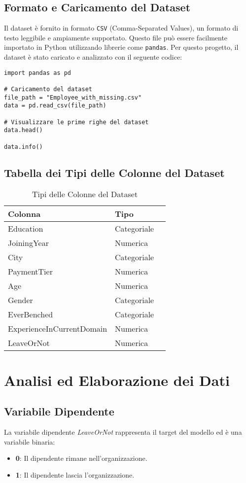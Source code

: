 \documentclass[a4paper,12pt]{article}
\begin{document}
\subsection{Formato e Caricamento del Dataset}
Il dataset è fornito in formato \texttt{CSV} (Comma-Separated Values), un formato di testo leggibile e ampiamente supportato. Questo file può essere facilmente importato in Python utilizzando librerie come \texttt{pandas}. Per questo progetto, il dataset è stato caricato e analizzato con il seguente codice:

\begin{verbatim}
import pandas as pd

# Caricamento del dataset
file_path = "Employee_with_missing.csv"
data = pd.read_csv(file_path)

# Visualizzare le prime righe del dataset
data.head()

data.info()
\end{verbatim}


\subsection{Tabella dei Tipi delle Colonne del Dataset}
\begin{table}[H]
\centering
\begin{tabular}{lll}
\toprule
\textbf{Colonna} & \textbf{Tipo}  \\
\midrule
Education & Categoriale \\
JoiningYear & Numerica  \\
City & Categoriale \\
PaymentTier & Numerica \\
Age & Numerica \\
Gender & Categoriale \\
EverBenched & Categoriale\\
ExperienceInCurrentDomain & Numerica  \\
LeaveOrNot & Numerica \\
\bottomrule
\end{tabular}
\caption{Tipi delle Colonne del Dataset}
\end{table}

\section{Analisi ed Elaborazione dei Dati}

\subsection{Variabile Dipendente}
La variabile dipendente \textit{LeaveOrNot} rappresenta il target del modello ed è una variabile binaria:
\begin{itemize}
    \item \textbf{0}: Il dipendente rimane nell'organizzazione.
    \item \textbf{1}: Il dipendente lascia l'organizzazione.
\end{itemize}
\end{document}
